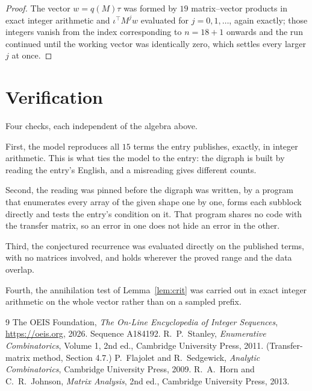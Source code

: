 \documentclass[11pt,a4paper]{article}
\theoremstyle{plain}
\theoremstyle{definition}
\begin{document}
\begin{proof}
The vector $w=q(M)\tau$ was formed by $19$ matrix--vector products in exact integer
arithmetic and $\iota^{\!\top}M^{j}w$ evaluated for $j=0,1,\dots$, again exactly; those
integers vanish from the index corresponding to $n=18+1$ onwards and the run continued
until the working vector was identically zero, which settles every larger $j$ at once.
\end{proof}

\section{Verification}

Four checks, each independent of the algebra above.

First, the model reproduces all $15$ terms the entry publishes, exactly, in integer
arithmetic. This is what ties the model to the entry: the digraph is built by reading the
entry's English, and a misreading gives different counts.

Second, the reading was pinned before the digraph was written, by a program that enumerates
every array of the given shape one by one, forms each subblock directly and tests the entry's
condition on it. That program shares no code with the transfer matrix, so an error in one does
not hide an error in the other.

Third, the conjectured recurrence was evaluated directly on the published terms, with no
matrices involved, and holds wherever the proved range and the data overlap.

Fourth, the annihilation test of Lemma~\ref{lem:crit} was carried out in exact integer
arithmetic on the whole vector rather than on a sampled prefix.

\begin{thebibliography}{9}
 The OEIS Foundation, \emph{The On-Line Encyclopedia of Integer
Sequences}, \url{https://oeis.org}, 2026. Sequence A184192.
 R.~P.~Stanley, \emph{Enumerative Combinatorics}, Volume 1, 2nd ed.,
Cambridge University Press, 2011. (Transfer-matrix method, Section 4.7.)
 P.~Flajolet and R.~Sedgewick, \emph{Analytic Combinatorics}, Cambridge
University Press, 2009.
 R.~A.~Horn and C.~R.~Johnson, \emph{Matrix Analysis}, 2nd ed., Cambridge
University Press, 2013.
\end{thebibliography}
\end{document}
